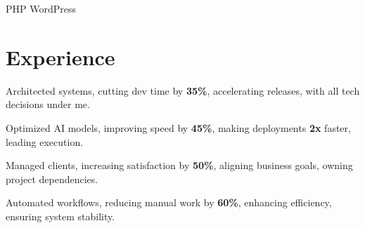 \documentclass[]{deedy-resume-openfont}
\begin{document}
\begin{minipage}[t]{0.33\textwidth}
    \vspace{8pt}  
    \textbullet{} PHP \textbullet{} WordPress \\  




    \end{minipage} 
    \hfill
    \begin{minipage}[t]{0.66\textwidth} 


    \section{Experience}
    \vspace{1em} %

    \vspace{1em}  
    
    \vspace{1em}  
    \begin{tightemize}  
        \item Architected systems, cutting dev time by \textbf{35\%}, accelerating releases, with all tech decisions under me.  
        \item Optimized AI models, improving speed by \textbf{45\%}, making deployments \textbf{2x} faster, leading execution.  
        \item Managed clients, increasing satisfaction by \textbf{50\%}, aligning business goals, owning project dependencies.  
        \item Automated workflows, reducing manual work by \textbf{60\%}, enhancing efficiency, ensuring system stability.  
    \end{tightemize}  
    \vspace{0.5em}  


\end{minipage}
\end{document}
